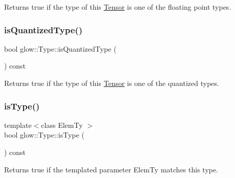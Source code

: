 \begin{DoxyReturn}{Returns}
true if the type of this \hyperlink{classglow_1_1_tensor}{Tensor} is one of the floating point types. 
\end{DoxyReturn}
\mbox{\label{structglow_1_1_type_a2b57c85b1cbe5d83c7a13c3a60c242e8}} 
\subsubsection{\texorpdfstring{is\+Quantized\+Type()}{isQuantizedType()}}
{\footnotesize\ttfamily bool glow\+::\+Type\+::is\+Quantized\+Type (\begin{DoxyParamCaption}{ }\end{DoxyParamCaption}) const\hspace{0.3cm}{\ttfamily [inline]}}

\begin{DoxyReturn}{Returns}
true if the type of this \hyperlink{classglow_1_1_tensor}{Tensor} is one of the quantized types. 
\end{DoxyReturn}
\mbox{\label{structglow_1_1_type_a07c025fdb2c0140b7906f3689fe7c175}} 
\subsubsection{\texorpdfstring{is\+Type()}{isType()}\hspace{0.1cm}{\footnotesize\ttfamily [1/2]}}
{\footnotesize\ttfamily template$<$class Elem\+Ty $>$ \\
bool glow\+::\+Type\+::is\+Type (\begin{DoxyParamCaption}{ }\end{DoxyParamCaption}) const\hspace{0.3cm}{\ttfamily [inline]}}

\begin{DoxyReturn}{Returns}
true if the templated parameter {\ttfamily Elem\+Ty} matches this type. 
\end{DoxyReturn}
\mbox{\label{structglow_1_1_type_ac2cf6671bd0fec4a8a2cd2c7686c9f75}} 
